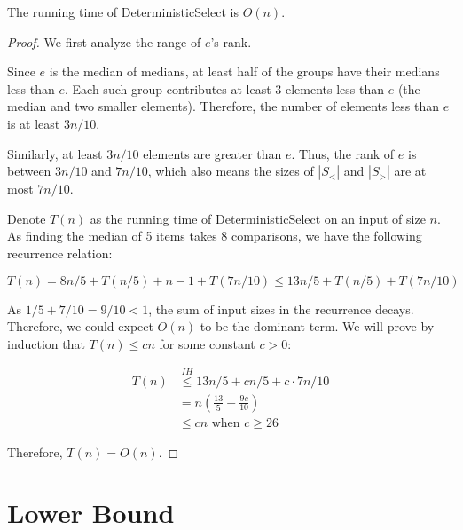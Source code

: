 \begin{theorem}
	The running time of DeterministicSelect is $O(n)$.
\end{theorem}
\begin{proof}
	We first analyze the range of $e$'s rank.

	Since $e$ is the median of medians, at least half of the groups have their medians less than $e$. Each such group contributes at least 3 elements less than $e$ (the median and two smaller elements). Therefore, the number of elements less than $e$ is at least $3n/10$.

	Similarly, at least $3n/10$ elements are greater than $e$. Thus, the rank of $e$ is between $3n/10$ and $7n/10$, which also means the sizes of $|S_<|$ and $|S_>|$ are at most $7n/10$.

	Denote $T(n)$ as the running time of DeterministicSelect on an input of size $n$. As finding the median of 5 items takes 8 comparisons, we have the following recurrence relation:

	\[ T(n) = 8n/5 + T(n/5) + n-1 + T(7n/10)\leq 13n/5 + T(n/5) + T(7n/10) \]

	As $1/5 + 7/10 = 9/10 < 1$, the sum of input sizes in the recurrence decays. Therefore, we could expect $O(n)$ to be the dominant term. We will prove by induction that $T(n) \leq c n$ for some constant $c > 0$:

	\begin{align*}
		T(n) & \overset{IH}{\leq} 13n/5 + c n/5 + c \cdot 7n/10 \\
		     & = n\left( \frac{13}{5} + \frac{9c}{10} \right)   \\
		     & \leq c n \text{ when } c \geq 26
	\end{align*}

	Therefore, $T(n) = O(n)$.
\end{proof}

\section{Lower Bound}

